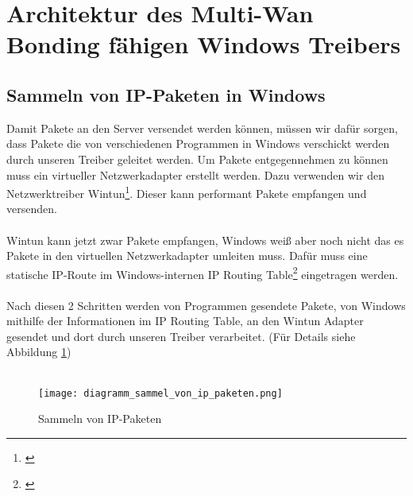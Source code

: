 \newpage
\section{Architektur des Multi-Wan Bonding fähigen Windows Treibers}
\subsection{Sammeln von IP-Paketen in Windows}
Damit Pakete an den Server versendet werden können, müssen wir dafür sorgen, dass Pakete die von verschiedenen Programmen in Windows verschickt werden durch unseren Treiber geleitet werden. Um Pakete entgegennehmen zu können muss ein virtueller Netzwerkadapter erstellt werden. Dazu verwenden wir den Netzwerktreiber Wintun\footnote[1]{\cite[Vgl.][]{1}}. Dieser kann performant Pakete empfangen und versenden.
\\\\
Wintun kann jetzt zwar Pakete empfangen, Windows weiß aber noch nicht das es Pakete in den virtuellen Netzwerkadapter umleiten muss. Dafür muss eine statische IP-Route im Windows-internen IP Routing Table\footnote[2]{\cite[Vgl.][]{2}} eingetragen werden.
\\\\
Nach diesen 2 Schritten werden von Programmen gesendete Pakete, von Windows mithilfe  der Informationen im IP Routing Table, an den Wintun Adapter gesendet und dort durch unseren Treiber verarbeitet. (Für Details siehe Abbildung \ref{driver-collect-packets})
\\\\
\begin{figure}[H]
    \centering
    \texttt{[image: diagramm\_sammel\_von\_ip\_paketen.png]}
    \caption[Sammeln von IP-Paketen]{Sammeln von IP-Paketen}
    \label{driver-collect-packets}
\end{figure}
\noindent

\newpage

